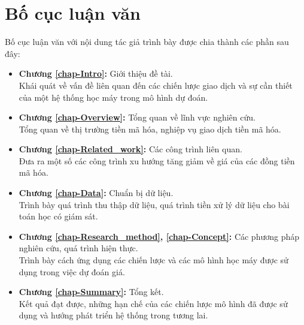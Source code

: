 \section{Bố cục luận văn}
Bố cục luận văn với nội dung tác giả trình bày được chia thành các phần sau đây:
\begin{itemize}
    \item \textbf{Chương \ref{chap-Intro}:} Giới thiệu đề tài.\\
    Khái quát về vấn đề liên quan đến các chiến lược giao dịch và sự cần thiết của một hệ thống học máy trong mô hình dự đoán.
    \item \textbf{Chương \ref{chap-Overview}:} Tổng quan về lĩnh vực nghiên cứu.\\
    Tổng quan về  thị trường tiền mã hóa, nghiệp vụ giao dịch tiền mã hóa.
    \item \textbf{Chương \ref{chap-Related_work}:} Các công trình liên quan.\\
    Đưa ra một số các công trình xu hướng tăng giảm về giá của các đồng tiền mã hóa.
    \item \textbf{Chương \ref{chap-Data}:} Chuẩn bị dữ liệu.\\
    Trình bày quá trình thu thập dữ liệu, quá trình tiền xử lý dữ liệu cho bài toán học có giám sát.
    \item \textbf{Chương \ref{chap-Research_method}, \ref{chap-Concept}:} Các phương pháp nghiên cứu, quá trình hiện thực.\\
    Trình bày cách ứng dụng các chiến lược và các mô hình học máy được sử dụng trong việc dự đoán giá.
    \item \textbf{Chương \ref{chap-Summary}:} Tổng kết.\\
    Kết quả đạt được, những hạn chế của các chiến lược mô hình đã được sử dụng và hướng phát triển hệ thống trong tương lai.
    
\end{itemize}
